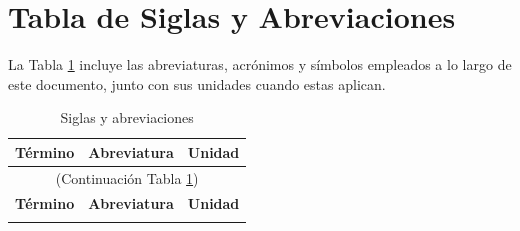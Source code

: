 
\chapter*{Tabla de Siglas y Abreviaciones}

La Tabla \ref{tab:siglas} incluye las abreviaturas, acrónimos y símbolos empleados a lo largo de este documento, junto con sus unidades cuando estas aplican.

\begin{longtable}{p{8.5cm} p{3cm} p{2cm}}
\caption{Siglas y abreviaciones}
\label{tab:siglas} \\
\toprule
\textbf{Término} & \textbf{Abreviatura} & \textbf{Unidad} \\
\midrule
\endfirsthead
\multicolumn{3}{c}{\small(Continuación Tabla \ref{tab:siglas})} \\
\toprule
\textbf{Término} & \textbf{Abreviatura} & \textbf{Unidad} \\
\midrule
\endhead
\bottomrule
\endfoot
\bottomrule
\endlastfoot


\end{longtable}
